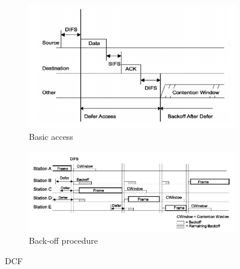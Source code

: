 \begin{figure}[h!]
\centering
\begin{subfigure}{.4\textwidth}
  \centering
    \includegraphics[width=1.1\textwidth]{figures/dcf-basic-access.png}
    \caption[Basic access]{Basic access \cite[p. 838]{ieee-802.11-2012}}
    \label{fig:dcf-basic-access}
\end{subfigure}%
\begin{subfigure}{0.6\textwidth}
  \centering
  \includegraphics[width=1.1\textwidth]{figures/dcf-backoff.png}
  \caption[Back-off procedure]{Back-off procedure \cite[p. 839]{ieee-802.11-2012}}
  \label{fig:dcf-back-off}
\end{subfigure}
\caption{\acf{DCF}}
\end{figure}

\blindtext

\blindtext

\blindtext
